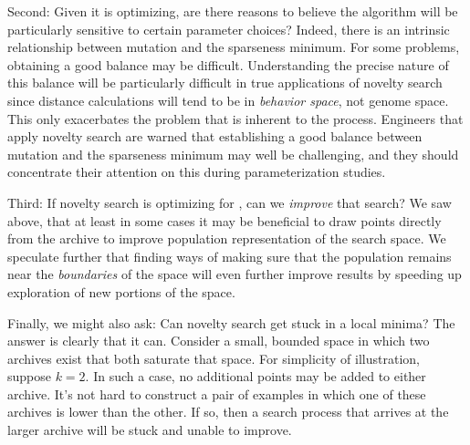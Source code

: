 \documentclass[twoside]{article}
\begin{document}
Second: Given it is optimizing, are there reasons to believe the algorithm will be particularly sensitive to certain parameter choices?  Indeed, there is an intrinsic relationship between mutation and the sparseness minimum.  For some problems, obtaining a good balance may be difficult.  Understanding the precise nature of this balance will be particularly difficult in true applications of novelty search since distance calculations will tend to be in \emph{behavior space}, not genome space.  This only exacerbates the problem that is inherent to the process.  Engineers that apply novelty search are warned that establishing a good balance between mutation and the sparseness minimum may well be challenging, and they should concentrate their attention on this during parameterization studies.

Third: If novelty search is optimizing for , can we \emph{improve} that search?  We saw above, that at least in some cases it may be beneficial to draw points directly from the archive to improve population representation of the search space.  We speculate further that finding ways of making sure that the population remains near the \emph{boundaries} of the space will even further improve results by speeding up exploration of new portions of the space.

Finally, we might also ask:  Can novelty search get stuck in a local minima?  The answer is clearly that it can.  Consider a small, bounded space in which two archives exist that both saturate that space.  For simplicity of illustration, suppose $k=2$.  In such a case, no additional points may be added to either archive.  It's not hard to construct a pair of examples in which one of these archives is lower  than the other.  If so, then a search process that arrives at the larger  archive will be stuck and unable to improve.  
\end{document}
